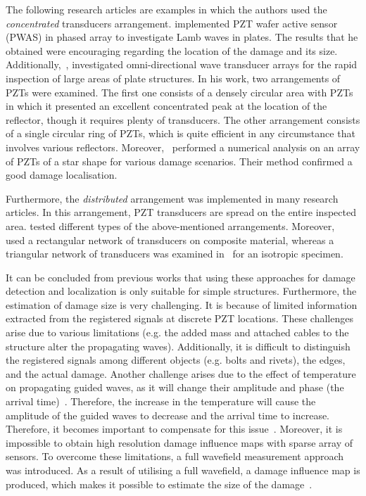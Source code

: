 The following research articles are examples in which the authors used the \emph{concentrated} transducers arrangement.
\textcite{Giurgiutiu2006} implemented PZT wafer active sensor (PWAS) in phased array to investigate Lamb waves in plates.
The results that he obtained were encouraging regarding the location of the damage and its size.
Additionally,~\textcite{Wilcox2003}, investigated omni-directional wave transducer arrays for the rapid inspection of large areas of plate structures. 
In his work, two arrangements of PZTs were examined. 
The first one consists of a densely circular area with PZTs in which it presented an excellent concentrated peak at the location of the reflector, though it requires plenty of transducers. 
The other arrangement consists of a single circular ring of PZTs, which is quite efficient in any circumstance that involves various reflectors.
Moreover,~\textcite{Malinowski2009} performed a numerical analysis on an array of PZTs of a star shape for various damage scenarios. 
Their method confirmed a good damage localisation.

Furthermore, the \emph{distributed} arrangement was implemented in many research articles. 
In this arrangement, PZT transducers are spread on the entire inspected area.
\textcite{Schubert2008} tested different types of the above-mentioned arrangements. 
Moreover,~\textcite{Qiang2009} used a rectangular network of transducers on composite material, whereas a triangular network of transducers was examined in~\cite{Wandowski2009} for an isotropic specimen.

It can be concluded from previous works that using these approaches for damage detection and localization is only suitable for simple structures. 
Furthermore, the estimation of damage size is very challenging.
It is because of limited information extracted from the registered signals at discrete PZT locations. 
These challenges arise due to various limitations (e.g. the added mass and attached cables to the structure alter the propagating waves). 
Additionally, it is difficult to distinguish the registered signals among different objects (e.g. bolts and rivets), the edges, and the actual damage. 
Another challenge arises due to the effect of temperature on propagating guided waves, as it will change their amplitude and phase (the arrival time)~\cite{Putkis2015}.
Therefore, the increase in the temperature will cause the amplitude of the guided waves to decrease and the arrival time to increase.
Therefore, it becomes important to compensate for this issue~\cite{Marzani1999}.
Moreover, it is impossible to obtain high resolution damage influence maps with sparse array of sensors.
To overcome these limitations, a full wavefield measurement approach was introduced. 
As a result of utilising a full wavefield, a damage influence map is produced, which makes it possible to estimate the size of the damage~\cite{Ostachowicz2014}.
